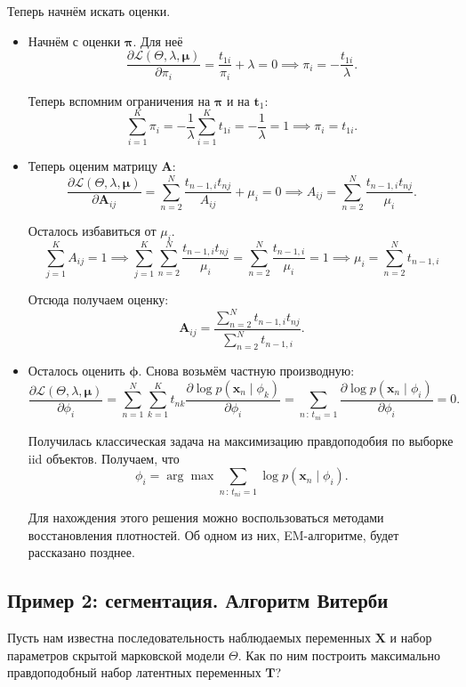 Теперь начнём искать оценки.
\begin{itemize}
	\item Начнём с оценки \(\bm{\pi}\). Для неё
	\[
		\frac{\partial \mathcal{L}(\Theta, \lambda, \bm{\mu})}{\partial 
		\pi_{i}} = \frac{t_{1i}}{\pi_{i}} + \lambda = 0 \implies \pi_{i} = 
		-\frac{t_{1i}}{\lambda}.
	\]
	
	Теперь вспомним ограничения на \(\bm{\pi}\) и на \(\mathbf{t}_{1}\):
	\[
		\sum_{i = 1}^{K} \pi_{i} = -\frac{1}{\lambda}\sum_{i = 1}^{K} t_{1i} = 
		-\frac{1}{\lambda} = 1 \implies \pi_{i} = t_{1i}.
	\]
	
	\item Теперь оценим матрицу \(\mathbf{A}\):
	\[
		\frac{\partial \mathcal{L}(\Theta, \lambda, \bm{\mu})}{\partial 
		\mathbf{A}_{ij}} = \sum_{n = 2}^{N} \frac{t_{n - 1, i}t_{nj}}{A_{ij}} + 
		\mu_{i} = 0 \implies A_{ij} = \sum_{n = 2}^{N} \frac{t_{n - 1, 
		i}t_{nj}}{\mu_{i}}.
	\]
	
	Осталось избавиться от \(\mu_{i}\).
	\[
		\sum_{j = 1}^{K} A_{ij} = 1 \implies \sum_{j = 1}^{K}\sum_{n = 2}^{N} 
		\frac{t_{n - 1, i}t_{nj}}{\mu_{i}} = \sum_{n = 2}^{N} \frac{t_{n - 1, 
		i}}{\mu_{i}} = 1 \implies \mu_{i} = \sum_{n = 2}^{N} t_{n - 1, i}
	\]
	
	Отсюда получаем оценку:
	\[
		\mathbf{A}_{ij} = \frac{\sum_{n = 2}^{N} t_{n - 1, i}t_{nj}}{\sum_{n = 
		2}^{N} t_{n - 1, i}}.
	\]
	
	\item Осталось оценить \(\bm{\phi}\). Снова возьмём частную производную:
	\[
		\frac{\partial \mathcal{L}(\Theta, \lambda, \bm{\mu})}{\partial 
		\phi_{i}} = \sum_{n = 1}^{N}\sum_{k = 1}^{K} t_{nk} \frac{\partial \log 
		p(\mathbf{x}_{n} \mid \phi_{k})}{\partial \phi_{i}} = \sum_{n\,:\,
		t_{ni} = 1} \frac{\partial \log p(\mathbf{x}_{n} \mid 
		\phi_{i})}{\partial \phi_{i}} = 0.
	\]
	
	Получилась классическая задача на максимизацию правдоподобия по выборке iid 
	объектов. Получаем, что
	\[
		\phi_{i} = \arg\max\sum_{n\,:\,t_{ni} = 1} \log p(\mathbf{x}_{n} \mid 
		\phi_{i}).
	\]
	
	Для нахождения этого решения можно воспользоваться методами восстановления 
	плотностей. Об одном из них, EM-алгоритме, будет рассказано позднее.
\end{itemize}

\subsection{Пример 2: сегментация. Алгоритм Витерби}
Пусть нам известна последовательность наблюдаемых переменных \(\mathbf{X}\) и 
набор параметров скрытой марковской модели \(\Theta\). Как по ним построить 
максимально правдоподобный набор латентных переменных \(\mathbf{T}\)?

